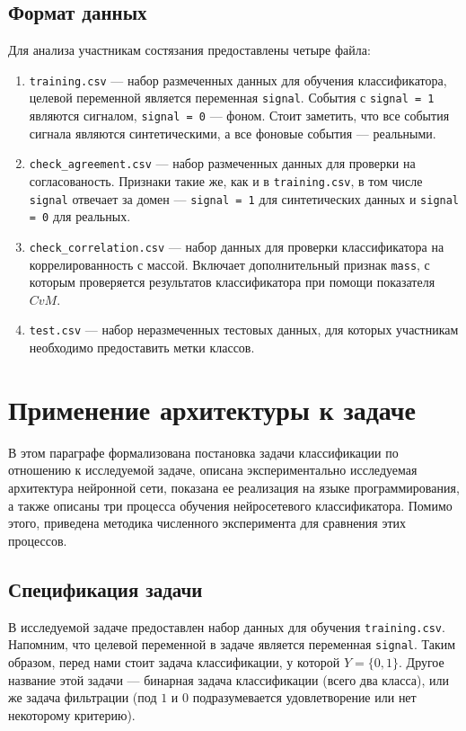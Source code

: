 \documentclass[14pt, a4paper]{extarticle}
\begin{document}
\subsection*{Формат данных}
Для анализа участникам состязания предоставлены четыре файла:
\begin{enumerate}
\item \texttt{training.csv} — набор размеченных данных для обучения классификатора, целевой переменной является переменная \texttt{signal}. События с  \texttt{signal = 1} являются сигналом, \texttt{signal = 0} — фоном. Стоит заметить, что все события сигнала являются синтетическими, а все фоновые события — реальными.
\item \texttt{check\_agreement.csv} — набор размеченных данных для проверки на согласованость. Признаки такие же, как и в \texttt{training.csv}, в том числе \texttt{signal} отвечает за домен — \texttt{signal = 1} для синтетических данных и \texttt{signal = 0} для реальных. 
\item \texttt{check\_correlation.csv} — набор данных для проверки классификатора на коррелированность с массой. Включает дополнительный признак \texttt{mass}, с которым проверяется результатов классификатора при помощи показателя $CvM$.
\item \texttt{test.csv} — набор неразмеченных тестовых данных, для которых участникам необходимо предоставить метки классов.
\end{enumerate}

\section{Применение архитектуры к задаче}
\label{paragraph:architecture}

В этом параграфе формализована постановка задачи классификации по отношению к исследуемой задаче, описана экспериментально исследуемая архитектура нейронной сети, показана ее реализация на языке программирования, а также описаны три процесса обучения нейросетевого классификатора. Помимо этого, приведена методика численного эксперимента для сравнения этих процессов.

\subsection*{Спецификация задачи}

В исследуемой задаче предоставлен набор данных для обучения \texttt{training.csv}. Напомним, что целевой переменной в задаче является переменная \texttt{signal}. Таким образом, перед нами стоит задача классификации, у которой $Y = \{0, 1\}$. Другое название этой задачи — бинарная задача классификации (всего два класса), или же задача фильтрации (под $1$ и $0$ подразумевается удовлетворение или нет некоторому критерию). 
\end{document}
